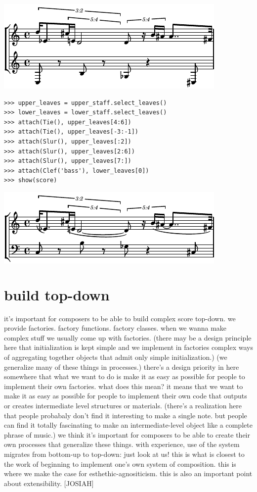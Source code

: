 \documentclass{article}
\begin{document}
\includegraphics[scale=1.0]{images/abjad-1.pdf}


\begin{lstlisting}
>>> upper_leaves = upper_staff.select_leaves()
>>> lower_leaves = lower_staff.select_leaves()
>>> attach(Tie(), upper_leaves[4:6])
>>> attach(Tie(), upper_leaves[-3:-1])
>>> attach(Slur(), upper_leaves[:2])
>>> attach(Slur(), upper_leaves[2:6])
>>> attach(Slur(), upper_leaves[7:])
>>> attach(Clef('bass'), lower_leaves[0])
>>> show(score)
\end{lstlisting}

\includegraphics[scale=1.0]{images/abjad-2.pdf}


\section{build top-down}

it's important for composers to be able to build complex
score top-down. we provide factories. factory functions. factory classes. when
we wanna make complex stuff we usually come up with factories. (there may be a
design principle here that initialization is kept simple and we implement in
factories complex ways of aggregating together objects that admit only simple
initialization.) (we generalize many of these things in processes.) there's a
design priority in here somewhere that what we want to do is make it as easy as
possible for people to implement their own factories. what does this mean? it
means that we want to make it as easy as possible for people to implement their
own code that outputs or creates intermediate level structures or materials.
(there's a realization here that people probabaly don't find it interesting to
make a single note. but people can find it totally fascinating to make an
intermediate-level object like a complete phrase of music.) we think it's
important for composers to be able to create their own processes that
generalize these things. with experience, use of the system migrates from
bottom-up to top-down: just look at us! this is what is closest to the work of
beginning to implement one's own system of composition. this is where we make
the case for esthethic-agnositicism. this is also an important point about
extensibility. [JOSIAH]
\end{document}
